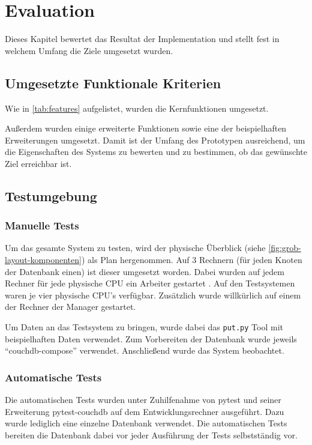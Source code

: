 \chapter{Evaluation}
\label{cha:eval}
Dieses Kapitel bewertet das Resultat der Implementation und
stellt fest in welchem Umfang die Ziele umgesetzt wurden.

\section{Umgesetzte Funktionale Kriterien}
\label{sec:eval:features}
Wie in \cref{tab:features} aufgelistet,
wurden die Kernfunktionen umgesetzt.

    

Außerdem wurden einige erweiterte Funktionen sowie eine der beispielhaften Erweiterungen umgesetzt.
Damit ist der Umfang des Prototypen ausreichend, um die Eigenschaften des Systems zu bewerten und zu bestimmen, ob das gewünschte Ziel erreichbar ist.


\section{Testumgebung}
\label{sec:eval:Testumgebung}

\subsection{Manuelle Tests}
Um das gesamte System zu testen, wird der physische Überblick (siehe \cref{fig:grob-layout-komponenten}) als Plan hergenommen.
Auf 3 Rechnern (für jeden Knoten der Datenbank einen) ist dieser umgesetzt worden.
Dabei wurden auf jedem Rechner für jede physische CPU ein Arbeiter gestartet .
Auf den Testsystemen waren je vier physische CPU's verfügbar.
Zusätzlich wurde willkürlich auf einem der Rechner der Manager gestartet.

Um Daten an das Testsystem zu bringen, wurde dabei das \verb|put.py| Tool mit beispielhaften Daten verwendet.
Zum Vorbereiten der Datenbank wurde jeweils ``couchdb-compose'' \cite{couchdb:compose} verwendet.
Anschließend wurde das System beobachtet.

\subsection{Automatische Tests}
Die automatischen Tests wurden unter Zuhilfenahme von pytest \cite{pytest:website} und seiner Erweiterung  pytest-couchdb \cite{pytest:couchdbkit} auf dem Entwicklungsrechner  ausgeführt.
Dazu wurde lediglich eine einzelne Datenbank verwendet.
Die automatischen Tests bereiten die Datenbank dabei vor jeder Ausführung der Tests selbstständig vor.


